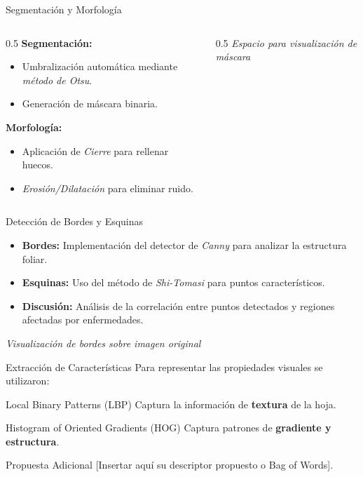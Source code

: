 \documentclass[10pt]{beamer}
\begin{document}
\begin{frame}{Segmentación y Morfología}
    \begin{columns}
        \begin{column}{0.5\textwidth}
            \textbf{Segmentación:}
            \begin{itemize}
                \item Umbralización automática mediante \textit{método de Otsu}.
                \item Generación de máscara binaria.
            \end{itemize}
            \textbf{Morfología:}
            \begin{itemize}
                \item Aplicación de \textit{Cierre} para rellenar huecos.
                \item \textit{Erosión/Dilatación} para eliminar ruido.
            \end{itemize}
        \end{column}
        \begin{column}{0.5\textwidth}
            \centering \textit{Espacio para visualización de máscara}
        \end{column}
    \end{columns}
\end{frame}



\begin{frame}{Detección de Bordes y Esquinas}
    \begin{itemize}
        \item \textbf{Bordes:} Implementación del detector de \textit{Canny} para analizar la estructura foliar.
        \item \textbf{Esquinas:} Uso del método de \textit{Shi-Tomasi} para puntos característicos.
        \item \textbf{Discusión:} Análisis de la correlación entre puntos detectados y regiones afectadas por enfermedades.
    \end{itemize}
    \centering \textit{Visualización de bordes sobre imagen original}
\end{frame}

\begin{frame}{Extracción de Características}
    Para representar las propiedades visuales se utilizaron:
    \begin{block}{Local Binary Patterns (LBP)}
        Captura la información de \textbf{textura} de la hoja.
    \end{block}
    \begin{block}{Histogram of Oriented Gradients (HOG)}
        Captura patrones de \textbf{gradiente y estructura}.
    \end{block}
    \begin{block}{Propuesta Adicional}
        [Insertar aquí su descriptor propuesto o Bag of Words].
    \end{block}
\end{frame}
\end{document}
